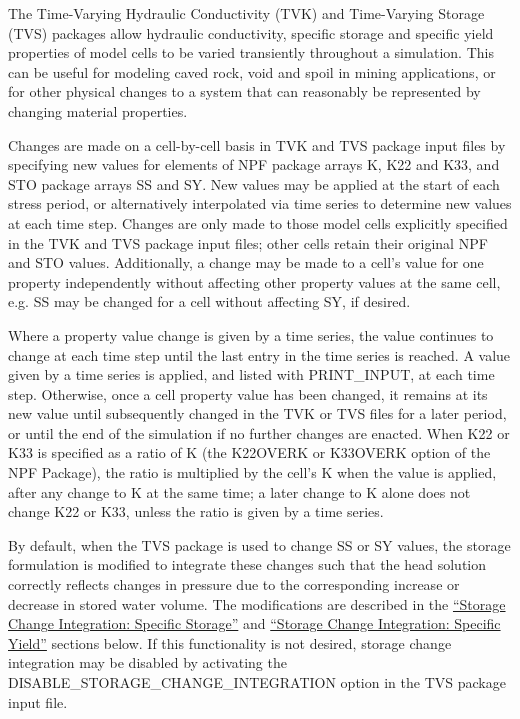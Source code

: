 
The \mf Time-Varying Hydraulic Conductivity (TVK) and Time-Varying Storage (TVS) packages allow hydraulic conductivity, specific storage and specific yield properties of model cells to be varied transiently throughout a simulation. This can be useful for modeling caved rock, void and spoil in mining applications, or for other physical changes to a system that can reasonably be represented by changing material properties.

Changes are made on a cell-by-cell basis in TVK and TVS package input files by specifying new values for elements of NPF package arrays K, K22 and K33, and STO package arrays SS and SY. New values may be applied at the start of each stress period, or alternatively interpolated via time series to determine new values at each time step. Changes are only made to those model cells explicitly specified in the TVK and TVS package input files; other cells retain their original NPF and STO values. Additionally, a change may be made to a cell's value for one property independently without affecting other property values at the same cell, e.g. SS may be changed for a cell without affecting SY, if desired.

Where a property value change is given by a time series, the value continues to change at each time step until the last entry in the time series is reached. A value given by a time series is applied, and listed with PRINT\_INPUT, at each time step. Otherwise, once a cell property value has been changed, it remains at its new value until subsequently changed in the TVK or TVS files for a later period, or until the end of the simulation if no further changes are enacted. When K22 or K33 is specified as a ratio of K (the K22OVERK or K33OVERK option of the NPF Package), the ratio is multiplied by the cell's K when the value is applied, after any change to K at the same time; a later change to K alone does not change K22 or K33, unless the ratio is given by a time series.

By default, when the TVS package is used to change SS or SY values, the \mf storage formulation is modified to integrate these changes such that the head solution correctly reflects changes in pressure due to the corresponding increase or decrease in stored water volume. The modifications are described in the \hyperref[sec:sci-ss]{``Storage Change Integration: Specific Storage''} and \hyperref[sec:sci-sy]{``Storage Change Integration: Specific Yield''} sections below. If this functionality is not desired, storage change integration may be disabled by activating the DISABLE\_STORAGE\_CHANGE\_INTEGRATION option in the TVS package input file.



